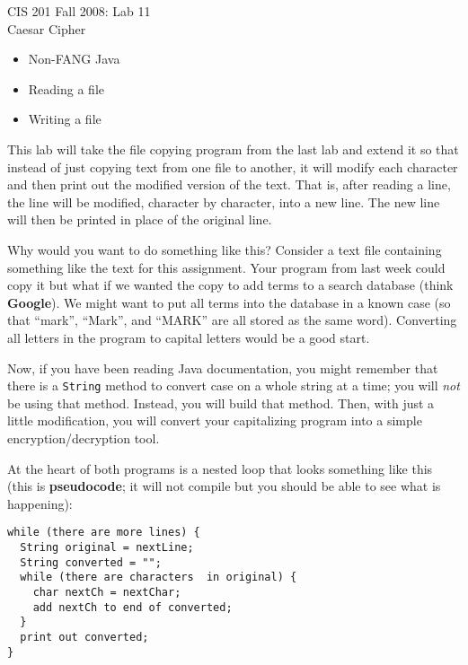 \documentclass[12pt,oneside]{memoir}
\newcommand\code[1]{\lstinline^#1^}
\begin{document}
\begin{center}
\Large{CIS 201 Fall 2008: Lab 11\\Caesar Cipher}
\end{center}

\begin{itemize}
\item Non-FANG Java
\item Reading a file
\item Writing a file
\end{itemize}

This lab will take the file copying program from the last lab and
extend it so that instead of just copying text from one file to
another, it will modify each character and then print out the modified
version of the text. That is, after reading a line, the line will be
modified, character by character, into a new line. The new line will
then be printed in place of the original line.

Why would you want to do something like this? Consider a text file
containing something like the text for this assignment. Your program
from last week could copy it but what if we wanted the copy to add
terms to a search database (think \textbf{Google}). We might want to
put all terms into the database in a known case (so that ``mark'',
``Mark'', and ``MARK'' are all stored as the same word). Converting
all letters in the program to capital letters would be a good start. 

Now, if you have been reading Java documentation, you might remember
that there is a \code{String} method to convert case on a whole string
at a time; you will \emph{not} be using that method. Instead, you will
build that method. Then, with just a little modification, you will
convert your capitalizing program into a simple encryption/decryption
tool.

At the heart of both programs is a nested loop that looks something
like this (this is \textbf{pseudocode}; it will not compile but you
should be able to see what is happening):

\begin{lstlisting}
while (there are more lines) {
  String original = nextLine;
  String converted = "";
  while (there are characters  in original) {
    char nextCh = nextChar;
    add nextCh to end of converted;
  }
  print out converted;
}
\end{lstlisting}
\end{document}
